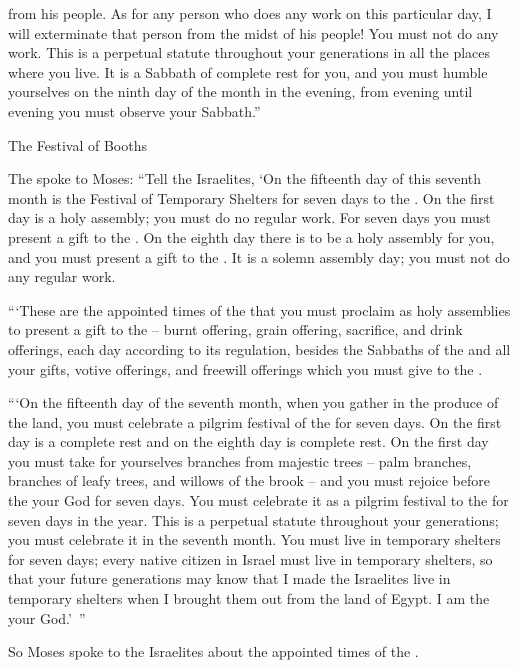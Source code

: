 {from his people.
As for any
person
who
does
any
work
on this
particular
day,
I will exterminate
that
person
from the midst
of his people!
You must not
do
any
work.
This is a perpetual
statute
throughout your generations
in all
the places where you live.
It is a Sabbath
of complete rest
for you, and you must humble
yourselves
on the ninth
day of the month
in the evening,
from evening
until
evening
you must observe
your Sabbath.”
\par }{\SH The Festival of Booths
\par }{\PP {}The
{}
spoke
to
Moses:
“Tell
the Israelites,
‘On
the fifteenth
day
of this
seventh
month
is the Festival
of Temporary Shelters
for seven
days
to the
{}.
On the first
day
is a holy
assembly;
you must do
no
regular
work.
For seven
days
you must present
a gift
to the
{}. On
the eighth
day
there is to be a holy
assembly
for you, and you must present
a gift
to the
{}. It is
a solemn assembly
day; you must not
do
any
regular
work.
\par }{\PP {}“‘These
are the appointed
times of the
{}
that
you must proclaim
as holy
assemblies
to present
a gift
to the
{} –
burnt offering,
grain offering,
sacrifice,
and drink offerings,
each day
according to its regulation,
besides
the Sabbaths
of the {}
and all
your gifts,
votive offerings,
and freewill
offerings which
you must give
to the
{}.
\par }{\PP {}“‘On
the fifteenth
day
of the seventh
month,
when you gather
in the produce
of the land,
you must celebrate
a pilgrim festival
of the {}
for seven
days.
On the first
day
is a complete rest
and on the eighth
day
is complete rest.
On the first
day
you must take
for yourselves branches
from majestic
trees –
palm
branches,
branches
of leafy
trees,
and willows
of the brook
– and you must rejoice
before
the {}
your God
for seven
days.
You must celebrate it as a pilgrim
festival
to the
{}
for seven
days
in the year.
This
is a perpetual
statute
throughout your generations;
you must celebrate
it in the seventh
month.
You must live
in temporary shelters
for seven
days;
every
native citizen
in Israel
must live
in temporary shelters,
so
that your future generations
may know
that
I made the Israelites
live
in temporary shelters
when
I brought them out
from the land
of Egypt.
I am
the {}
your God.’ ”
\par }{\PP {}So Moses
spoke
to
the Israelites
about the appointed
times of the
{}.

}
